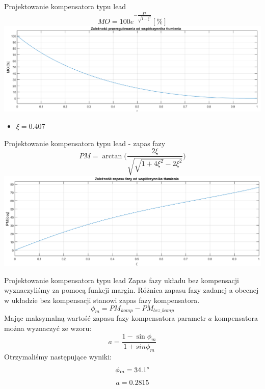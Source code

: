 \documentclass{beamer}
\begin{document}
\begin{frame}{Projektowanie kompensatora typu lead}
	\begin{equation*}
	MO = 100e^{- \frac{\xi\pi}{\sqrt{1-\xi^2}}} [\%]  
	\end{equation*}
	\includegraphics[width = \linewidth]{ksi}
\begin{itemize}
\item $\xi = 0.407$
\end{itemize}
\end{frame}	

\begin{frame}{Projektowanie kompensatora typu lead - zapas fazy}
	\begin{equation*}
	PM = \arctan \Bigg( \frac{2\xi}{\sqrt{\sqrt{1+4\xi^2}-2\xi^2}} \Bigg)
	\end{equation*}
	\includegraphics[width = \linewidth]{faza}

\end{frame}	
\begin{frame}{Projektowanie kompensatora typu lead}
Zapas fazy układu bez kompensacji wyznaczyliśmy za pomocą funkcji margin. Różnica zapasu fazy zadanej a obecnej w układzie bez kompensacji stanowi zapas fazy kompensatora.
	\begin{equation*}
	\phi_{m} = PM_{komp} - PM_{bez\_komp}
	\end{equation*}
Mając maksymalną wartość zapasu fazy kompensatora parametr $a$ kompensatora można wyznaczyć ze wzoru:
	\begin{equation*}
	a = \frac{1-\sin\phi_{m}}{1+sin\phi_{m}}
	\end{equation*}
Otrzymaliśmy następujące wyniki:
\begin{equation*}
\phi_{m} = 34.1 \degree
\end{equation*}
\begin{equation*}
a = 0.2815
\end{equation*}

	
\end{frame}	
\end{document}
